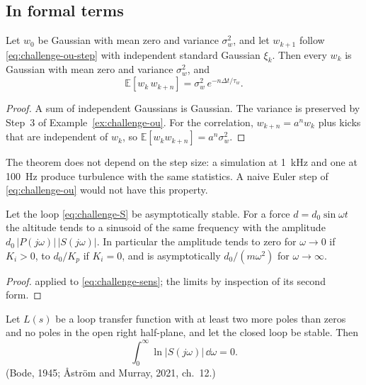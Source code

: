 \subsection{In formal terms}

\begin{theorem}
\label{thm:challenge-ou}
Let $w_0$ be Gaussian with mean zero and variance $\sigma_w^2$, and let $w_{k+1}$ follow \cref{eq:challenge-ou-step} with independent standard Gaussian $\xi_k$. Then every $w_k$ is Gaussian with mean zero and variance $\sigma_w^2$, and
\begin{equation*}
  \mathbb{E}[w_k\,w_{k+n}] = \sigma_w^2\,e^{-n\Delta t/\tau_w} .
\end{equation*}
\end{theorem}
\begin{proof}
A sum of independent Gaussians is Gaussian. The variance is preserved by Step~3 of Example~\ref{ex:challenge-ou}. For the correlation, $w_{k+n} = a^n w_k$ plus kicks that are independent of $w_k$, so $\mathbb{E}[w_kw_{k+n}] = a^n\sigma_w^2$.
\end{proof}

The theorem does not depend on the step size: a simulation at \SI{1}{kHz} and one at \SI{100}{Hz} produce turbulence with the same statistics. A naive Euler step of \cref{eq:challenge-ou} would not have this property.

\begin{theorem}
\label{thm:challenge-dist}
Let the loop \eqref{eq:challenge-S} be asymptotically stable. For a force $d = d_0\sin\omega t$ the altitude tends to a sinusoid of the same frequency with the amplitude $d_0\,|P(j\omega)|\,|S(j\omega)|$. In particular the amplitude tends to zero for $\omega \to 0$ if $K_i > 0$, to $d_0/K_p$ if $K_i = 0$, and is asymptotically $d_0/(m\omega^2)$ for $\omega \to \infty$.
\end{theorem}
\begin{proof}
 applied to \cref{eq:challenge-sens}; the limits by inspection of its second form.
\end{proof}

\begin{theorem}
\label{thm:challenge-bode}
Let $L(s)$ be a loop transfer function with at least two more poles than zeros and no poles in the open right half-plane, and let the closed loop be stable. Then
\begin{equation*}
  \int_0^\infty \ln|S(j\omega)|\,\dd\omega = 0 .
\end{equation*}
(Bode, 1945; Åström and Murray, 2021, ch.~12.)
\end{theorem}

